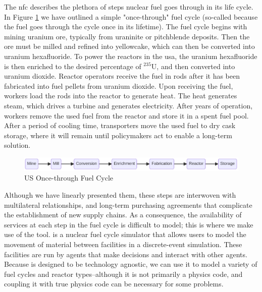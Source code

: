 The \gls{nfc} describes the plethora of steps nuclear fuel goes through
in its life cycle. In Figure \ref{fig:once-through} we have outlined a
simple "once-through" fuel cycle (so-called because the fuel goes through
the cycle once in its lifetime). The fuel cycle begins with mining uranium ore,
typically from uraninite or pitchblende deposits. Then the ore must be milled
and refined into yellowcake, which can then be converted into uranium
hexafluoride. To power the reactors in the \gls{usa}, the uranium hexafluoride
is then enriched to the desired percentage of $^{235}$U, and then converted
into uranium dioxide. Reactor operators receive the fuel in rods after it has
been fabricated into fuel pellets from uranium dioxide. Upon receiving the
fuel, workers load the rods into the reactor to generate heat. The heat
generates steam, which drives a turbine and generates electricity. After years
of operation, workers remove the used fuel from the reactor and store it in a
spent fuel pool. After a period of cooling time, transporters move the used
fuel to dry cask storage, where it will remain until policymakers act to enable
a long-term solution.

\begin{figure}[h]
    \centering
    \includegraphics[scale=0.40]{images/once_through_fc.png}
    \caption{US Once-through Fuel Cycle}
    \label{fig:once-through}
\end{figure}

Although we have linearly presented them, these steps are interwoven with
multilateral relationships, and long-term purchasing agreements that complicate
the establishment of new supply chains. As a consequence, the availability of
services at each step in the fuel cycle is difficult to model; this is where we
make use of the \cyclus \cite{huff_cyclus_intro_2016} tool. \cyclus is a
nuclear fuel cycle simulator that allows users to model the movement of
material between facilities in a discrete-event simulation. These facilities
are run by agents that make decisions and interact with other agents. Because
\cyclus is designed to be technology agnostic, we can use it to model a variety
of fuel cycles and reactor types--although it is not primarily a physics code,
and coupling it with true physics code can be necessary for some problems.

